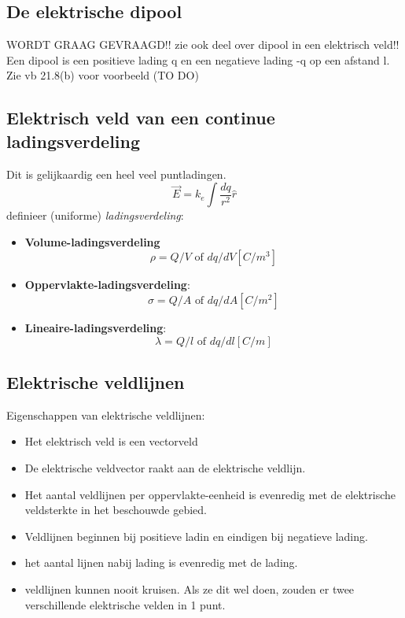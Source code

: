 \documentclass[12pt,a4paper]{article}
\begin{document}
    \subsection{De elektrische dipool}
    WORDT GRAAG GEVRAAGD!! zie ook deel over dipool in een elektrisch veld!!
    \newline
    Een dipool is een positieve lading q en een negatieve lading -q op een afstand l. Zie vb 21.8(b) voor voorbeeld (TO DO)
	
	\subsection{Elektrisch veld van een continue ladingsverdeling}
	Dit is gelijkaardig een heel veel puntladingen. 
	\[\vec{E} = k_e\int\frac{dq}{r^2}\hat{r}\]
	definieer (uniforme) \textit{ladingsverdeling}:
	\begin{itemize}
		\item \textbf{Volume-ladingsverdeling}
		 \[\rho = Q/V \text{ of } dq/dV [C/m^3]\]
		\item \textbf{Oppervlakte-ladingsverdeling}:
		 \[\sigma = Q/A \text{ of } dq/dA [C/m^2]\]
		\item \textbf{Lineaire-ladingsverdeling}:
		 \[\lambda = Q/l \text{ of } dq/dl [C/m]\]
	\end{itemize}
	\subsection{Elektrische veldlijnen}
	Eigenschappen van elektrische veldlijnen:
	\begin{itemize}
		\renewcommand\labelitemi{--}
		\item Het elektrisch veld is een vectorveld
		\item De elektrische veldvector raakt aan de elektrische veldlijn.
		\item Het aantal veldlijnen per oppervlakte-eenheid is evenredig met de elektrische veldsterkte in het beschouwde gebied.
		\item Veldlijnen beginnen bij positieve ladin en eindigen bij negatieve lading.
		\item het aantal lijnen nabij lading is evenredig met de lading.
		\item veldlijnen kunnen nooit kruisen. Als ze dit wel doen, zouden er twee verschillende elektrische velden in 1 punt. 
	\end{itemize}
\end{document}
